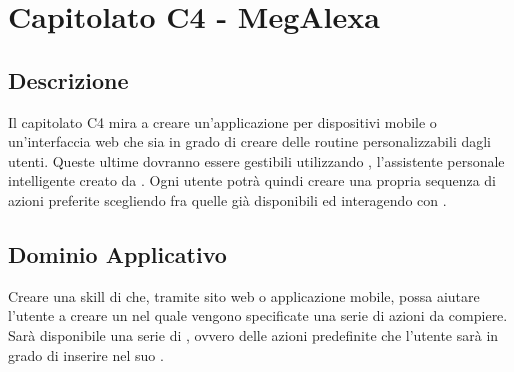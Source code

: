 \clearpage
\section{Capitolato C4 - MegAlexa}
\subsection{Descrizione}
Il capitolato C4 mira a creare un'applicazione per dispositivi mobile o un'interfaccia web che sia in grado di creare delle routine personalizzabili dagli utenti.
Queste ultime dovranno essere gestibili utilizzando , l'assistente personale intelligente creato da . Ogni utente potrà quindi creare una propria sequenza di azioni preferite scegliendo fra quelle già disponibili ed interagendo con .

\subsection{Dominio Applicativo}
Creare una skill di  che, tramite sito web o applicazione mobile, possa aiutare l'utente a creare un  nel quale vengono specificate una serie di azioni da compiere. 
Sarà disponibile una serie di , ovvero delle azioni predefinite che l'utente sarà in grado di inserire nel suo .

